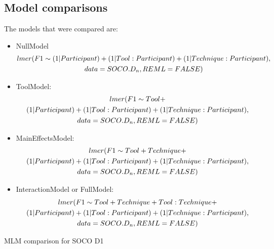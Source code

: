 \documentclass[a4paper, 12pt, oneside, openany, final, pdftex]{book}\usepackage[]{graphicx}\usepackage[]{color}
\begin{document}
\begin{appendices}
  \chapter{Model comparisons}\label{apx:mlmModelcomparison}

  

The models that were compared are:

\begin{itemize}

\item NullModel
\begin{gather*}
lmer(F1 \sim (1 | Participant) + (1 | Tool:Participant) + (1 | Technique:Participant), \notag\\
     data = SOCO.D_n, REML = FALSE)
\end{gather*}

\item ToolModel: 
\begin{gather*}
lmer(F1 \sim Tool + \notag\\
             (1 | Participant) + (1 | Tool:Participant) + (1 | Technique:Participant), \notag\\ 
     data = SOCO.D_n, REML = FALSE)
\end{gather*}

\item MainEffectsModel: 
\begin{gather*}
lmer(F1 \sim Tool + Technique + \notag\\
             (1 | Participant) + (1 | Tool:Participant) + (1 | Technique:Participant), \notag\\ 
     data = SOCO.D_n, REML = FALSE)
\end{gather*}

\item InteractionModel or FullModel: 
\begin{gather*}
lmer(F1 \sim Tool + Technique + Tool:Technique + \notag\\
             (1 | Participant) + (1 | Tool:Participant) + (1 | Technique:Participant), \notag\\ 
     data = SOCO.D_n, REML = FALSE)
\end{gather*}

\end{itemize}
\begin{landscape}
\begin{table}
  \centering
  \caption{\gls{MLM} comparison for SOCO D1}\label{tbl:mlmComparisonSOCOD1}


\end{table}
\end{landscape}
\end{appendices}
\end{document}

